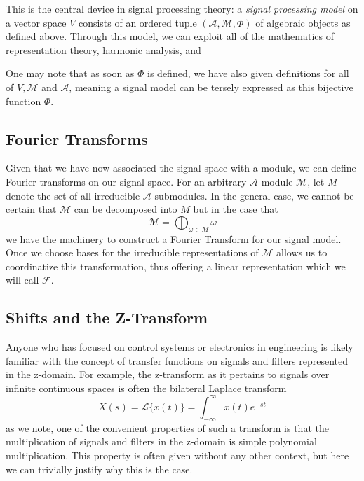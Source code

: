 \documentclass[12pt,technote]{IEEEtran}
\begin{document}
This is the central device in signal processing theory: a \textit{signal processing model} on a vector space $V$ consists of an ordered tuple $(\mathcal{A}, \mathcal{M}, \Phi)$ of algebraic objects as defined above. Through this model, we can exploit all of the mathematics of representation theory, harmonic analysis, and 

One may note that as soon as $\Phi$ is defined, we have also given definitions for all of $V, \mathcal{M}$ and $\mathcal{A}$, meaning a signal model can be tersely expressed as this bijective function $\Phi$.

\subsection{Fourier Transforms}
Given that we have now associated the signal space with a module, we can define Fourier transforms on our signal space. For an arbitrary $\mathcal{A}$-module $\mathcal{M}$, let $M$ denote the set of all irreducible $\mathcal{A}$-submodules. In the general case, we cannot be certain that $\mathcal{M}$ can be decomposed into $M$ but in the case that
\begin{equation*}
    \mathcal{M} = \bigoplus_{\omega\in M}\omega
\end{equation*}
we have the machinery to construct a Fourier Transform for our signal model. Once we choose bases for the irreducible representations of $\mathcal{M}$ allows us to coordinatize this transformation, thus offering a linear representation which we will call $\mathcal{F}$.

\subsection{Shifts and the Z-Transform}

Anyone who has focused on control systems or electronics in engineering is likely familiar with the concept of transfer functions on signals and filters represented in the z-domain. For example, the z-transform as it pertains to signals over infinite continuous spaces is often the bilateral Laplace transform
\begin{equation*}
    X(s) = \mathcal{L}\{x(t)\} = \int_{-\infty}^\infty x(t)e^{-st}
\end{equation*}
as we note, one of the convenient properties of such a transform is that the multiplication of signals and filters in the z-domain is simple polynomial multiplication. This property is often given without any other context, but here we can trivially justify why this is the case. 
\end{document}
